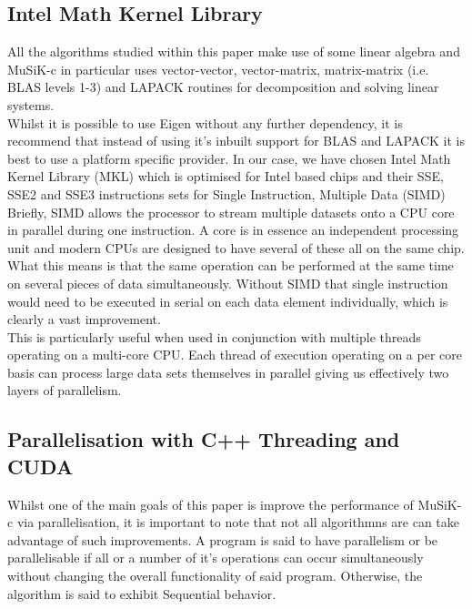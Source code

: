 \documentclass[a4paper]{amsart}
\begin{document}
\subsection{Intel Math Kernel Library}
All the algorithms studied within this paper make use of some linear algebra and MuSiK-c in particular uses vector-vector, vector-matrix, matrix-matrix (i.e. BLAS levels 1-3) and LAPACK routines for decomposition and solving linear systems.\\

Whilst it is possible to use Eigen without any further dependency, it is recommend that instead of using it's inbuilt support for BLAS and LAPACK it is best to use a platform specific provider. In our case, we have chosen Intel Math Kernel Library\cite{mkl1} (MKL) which is optimised for Intel based chips\cite{mkl2} and their SSE\cite{mkl4}, SSE2 and SSE3 instructions sets for Single Instruction, Multiple Data\cite{mkl3} (SIMD)\\

Briefly, SIMD allows the processor to stream multiple datasets onto a CPU core in parallel during one instruction. A core is in essence an independent processing unit and modern CPUs are designed to have several of these all on the same chip. What this means is that the same operation can be performed at the same time on several pieces of data simultaneously. Without SIMD that single instruction would need to be executed in serial on each data element individually, which is clearly a vast improvement.\\

This is particularly useful when used in conjunction with multiple threads operating on a multi-core CPU. Each thread of execution operating on a per core basis can process large data sets themselves in parallel giving us effectively two layers of parallelism.



\subsection{Parallelisation with C++ Threading and CUDA}

Whilst one of the main goals of this paper is improve the performance of MuSiK-c via parallelisation, it is important to note that not all algorithmns are can take advantage of such improvements. A program is said to have parallelism or be parallelisable if all or a number of it's operations can occur simultaneously without changing the overall functionality of said program. Otherwise, the algorithm is said to exhibit Sequential behavior.
\end{document}
